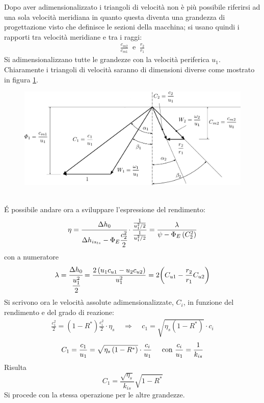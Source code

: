 \vspace{0.5cm}
Dopo aver adimensionalizzato i triangoli di velocità non è più possibile riferirsi ad una sola velocità meridiana in quanto questa diventa una grandezza di progettazione visto che definisce le sezioni della macchina; si usano quindi i rapporti tra velocità meridiane e tra i raggi:
\begin{align*}
\frac{c_{m2}}{c_{m1}} \;\; \text{e} \;\; \frac{r_2}{r_1}
\end{align*}
Si adimensionalizzano tutte le grandezze con la velocità periferica $u_1$. Chiaramente i triangoli di velocità saranno di dimensioni diverse come mostrato in figura \ref{fig:triangTurb}. 
\begin{figure}[h!]
\centering
  \includegraphics[width=.8\textwidth]{fig/triangTurb.pdf}
\caption{}
\label{fig:triangTurb}
\end{figure}
\\\'E possibile andare ora a sviluppare l'espressione del rendimento:
\begin{equation}
\eta = \cfrac{\Delta h_0}{\Delta h_{is_{ts}} - \Phi_E \cfrac{c_2^2}{2}} \cdot \frac{\frac{1}{u_1^2/2}}{\frac{1}{u_1^2/2}} = \frac{\lambda}{\psi - \Phi_E \left( C_2^2 \right)}
\end{equation}
con a numeratore
\begin{align*}
\lambda = \cfrac{\Delta h_0}{\cfrac{u_1^2}{2}} = \frac{2 \left( u_1 c_{u1} - u_2 c_{u2} \right)}{u_1^2} = 2 \bigg( C_{u1} - \frac{r_2}{r_1} C_{u2} \bigg)
\end{align*}
Si scrivono ora le velocità assolute adimensionalizzate, $C_i$, in funzione del rendimento e del grado di reazione:
\begin{align*}
\frac{c_1^2}{2} = \left( 1 - R^* \right) \frac{c_i^2}{2} \cdot \eta_s \;\;\;\; \Rightarrow \;\;\;\; c_1 = \sqrt{\eta_s \left( 1 - R^* \right)} \cdot c_i
\end{align*}
\begin{align*}
C_1 = \frac{c_1}{u_1} = \sqrt{\eta_s \left(1- R^* \right)} \cdot \frac{c_i}{u_1} \hspace{0.5cm} \mbox{con } \frac{c_i}{u_1} = \frac{1}{k_{is}}
\end{align*}
Risulta
\begin{equation}
\boxed{ C_1 = \frac{\sqrt{\eta_s}}{k_{is}} \sqrt{1 - R^*} }
\end{equation}
Si procede con la stessa operazione per le altre grandezze.

